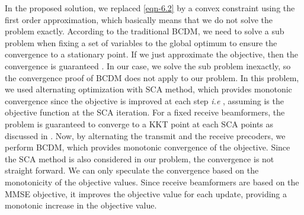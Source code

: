 In the proposed solution, we replaced \eqref{eqn-6.2} by a convex constraint using the first order approximation, which basically means that we do not solve the problem exactly. According to the traditional \ac{BCDM}, we need to solve a sub problem when fixing a set of variables to the global optimum to ensure the convergence to a stationary point. If we just approximate the objective, then the convergence is guaranteed \cite{razaviyayn2013unified}. In our case, we solve the sub problem inexactly, so the convergence proof of \ac{BCDM} does not apply to our problem. In this problem, we used alternating optimization with \ac{SCA} method, which provides monotonic convergence since the objective is improved at each step \textit{i.e} , assuming  is the objective function at the  \ac{SCA} iteration. For a fixed receive beamformers, the problem is guaranteed to converge to a \ac{KKT} point at each \ac{SCA} points as discussed in \cite{marks1978technical}. Now, by alternating the transmit and the receive precoders, we perform \ac{BCDM}, which provides monotonic convergence of the objective. Since the \ac{SCA} method is also considered in our problem, the convergence is not straight forward. We can only speculate the convergence based on the monotonicity of the objective values. Since receive beamformers are based on the \ac{MMSE} objective, it improves the objective value for each update, providing a monotonic increase in the objective value.

